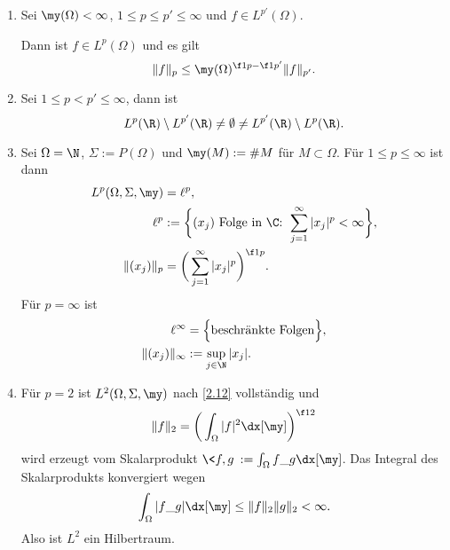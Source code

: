 \begin{st} \label{2.16}
	\begin{enumerate}[1)]
		\item
			Sei $\my(\Omega) < \infty$, $1 \le p \le p' \le \infty$ und $f \in L^{p'}(\Omega)$.

			Dann ist $f \in L^p(\Omega)$ und es gilt
			\[
				\|f\|_p \le \my(\Omega)^{\f 1p - \f 1{p'}} \|f\|_{p'}.
			\]
		\item
			Sei $1 \le p < p' \le \infty$, dann ist
			\[
				L^p(\R) \setminus L^{p'}(\R) \neq \emptyset \neq L^{p'}(\R) \setminus L^p(\R).
			\]
		\item
			Sei $\Omega = \N$, $\Sigma := P(\Omega)$ und $\my(M) := \#M$ für $M \subset \Omega$.
			Für $1 \le p \le \infty$ ist dann
			\begin{align*}
				L^p(\Omega, \Sigma, \my) &= \ell^p, \\
				\ell^p &:= \bigg\{ (x_j) \text{ Folge in $\C$: } \sum_{j=1}^\infty |x_j|^p < \infty \bigg\} ,\\
				\|(x_j)\|_p &= \bigg( \sum_{j=1}^\infty |x_j|^p \bigg)^{\f 1p}.
			\end{align*}
			Für $p = \infty$ ist
			\begin{align*}
				\ell^\infty &= \Big\{ \text{beschränkte Folgen} \Big\}, \\
				\|(x_j)\|_\infty &:= \sup_{j\in \N} |x_j|.
			\end{align*}
		\item
			Für $p=2$ ist $L^2(\Omega, \Sigma, \my)$ nach \ref{2.12} vollständig und
			\[
				\|f\|_2 = \bigg( \int_{\Omega} |f|^2 \dx[\my] \bigg)^{\f 12}
			\]
			wird erzeugt vom Skalarprodukt $\<f,g\> := \int_{\Omega} f \_g \dx[\my]$.
			Das Integral des Skalarprodukts konvergiert wegen 
			\[
				\int_{\Omega} |f \_g|\dx[\my] \le \|f\|_2 \|g\|_2 < \infty.
			\]
			Also ist $L^2$ ein Hilbertraum.
	\end{enumerate}
\end{st}
